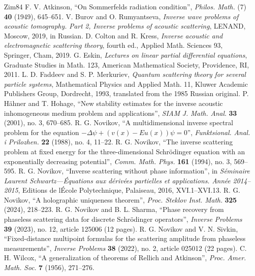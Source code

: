 \documentclass[10pt,a4paper]{amsart}
\theoremstyle{definition}
\begin{document}
\begin{thebibliography}{Zim84}
 F. V. Atkinson, ``On Sommerfeld\textquotesingle s radiation condition'', \emph{Philos. Math.} (7) \textbf{40} (1949), 645--651.
 V. Burov and O. Rumyantseva, \emph{Inverse wave problems of acoustic tomography. Part 2, Inverse problems of acoustic scattering}, LENAND, Moscow, 2019, in Russian.
 D. Colton and R. Kress, \emph{Inverse acoustic and electromagnetic scattering theory}, fourth ed., Applied Math. Sciences 93, Springer, Cham, 2019.
 G. Eskin, \emph{Lectures on linear partial differential equations}, Graduate Studies in Math. 123, American Mathematical Society, Providence, RI, 2011.
 L. D. Faddeev and S. P. Merkuriev, \emph{Quantum scattering theory for several particle systems}, Mathematical Physics and Applied Math. 11, Kluwer Academic Publishers Group, Dordrecht, 1993, translated from the 1985 Russian original.
 P. H\"ahner and T. Hohage, ``New stability estimates for the inverse acoustic inhomogeneous medium problem and applications'', \emph{SIAM J. Math. Anal.} \textbf{33} (2001), no. 3, 670--685.
 R. G. Novikov, ``A multidimensional inverse spectral problem for the equation $-\Delta\psi+(v(x)-Eu(x))\psi=0$'', \emph{Funktsional. Anal. i Prilozhen.} \textbf{22} (1988), no. 4, 11--22.
 R. G. Novikov, ``The inverse scattering problem at fixed energy for the three-dimensional Schr\"odinger equation with an exponentially decreasing potential'', \emph{Comm. Math. Phys.} \textbf{161} (1994), no. 3, 569--595.
 R. G. Novikov, ``Inverse scattering without phase information'', in \emph{S\'eminaire Laurent Schwartz---\'Equations aux d\'eriv\'ees partielles et applications. Ann\'ee 2014--2015}, Editions de l\textquotesingle\'Ecole Polytechnique, Palaiseau, 2016, XVI.1--XVI.13.
 R. G. Novikov, ``A holographic uniqueness theorem'', \emph{Proc. Steklov Inst. Math.} \textbf{325} (2024), 218--223.
 R. G. Novikov and B. L. Sharma, ``Phase recovery from phaseless scattering data for discrete Schr\"odinger operators'', \emph{Inverse Problems} \textbf{39} (2023), no. 12, article 125006 (12 pages).
 R. G. Novikov and V. N. Sivkin, ``Fixed-distance multipoint formulas for the scattering amplitude from phaseless measurements'', \emph{Inverse Problems} \textbf{38} (2022), no. 2, article 025012 (22 pages).
 C. H. Wilcox, ``A generalization of theorems of Rellich and Atkinson'', \emph{Proc. Amer. Math. Soc.} \textbf{7} (1956), 271--276.
\end{thebibliography}
\end{document}
